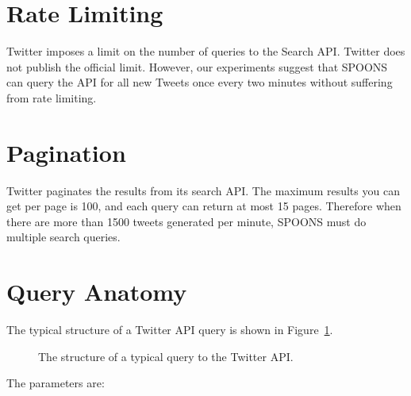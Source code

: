 \documentclass[12pt]{ucthesis}
\newcommand{\captionfonts}{\small\bf\ssp}
\begin{document}
\section{Rate Limiting}
\label{api-rate-limit}
Twitter imposes a limit on the number of queries to the Search API. Twitter does not publish the official
limit. However, our experiments suggest that SPOONS can query the API for all new Tweets once every two minutes without
suffering from rate limiting.

\section{Pagination}
\label{api-pagination}
Twitter paginates the results from its search API. The maximum results you can get per page is 100, and each
query can return at most 15 pages. Therefore when there are more than 1500 tweets generated per minute,
SPOONS must do multiple search queries.

\section{Query Anatomy}
\label{api-anatomy}
The typical structure of a Twitter API query is shown in Figure~\ref{fig:apiQuery}.

\begin{figure}[H]
   \begin{center}
      \captionfonts
      \caption[Twitter API Query]{The structure of a typical query to the Twitter API.}
      \label{fig:apiQuery}
   \end{center}
\end{figure}

The parameters are:
\end{document}
